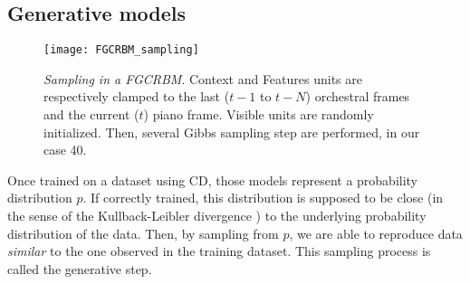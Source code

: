 \documentclass[letterpaper]{article}
\begin{document}

\subsection{Generative models}
\begin{figure}
\centering
\texttt{[image: FGCRBM\_sampling]}
\caption{\textit{Sampling in a FGCRBM}. Context and Features units are respectively clamped to the last ($t-1$ to $t-N$) orchestral frames and the current ($t$) piano frame. Visible units are randomly initialized. Then, several Gibbs sampling step are performed, in our case 40.}
\label{fig:FGCRBM_sampling}
\end{figure}
Once trained on a dataset using CD, those models represent a probability distribution $p$. If correctly trained, this distribution is supposed to be close (in the sense of the Kullback-Leibler divergence \cite{hinton2002training}) to the underlying probability distribution of the data. Then, by sampling from $p$, we are able to reproduce data \textit{similar} to the one observed in the training dataset.
This sampling process is called the generative step.
\end{document}
